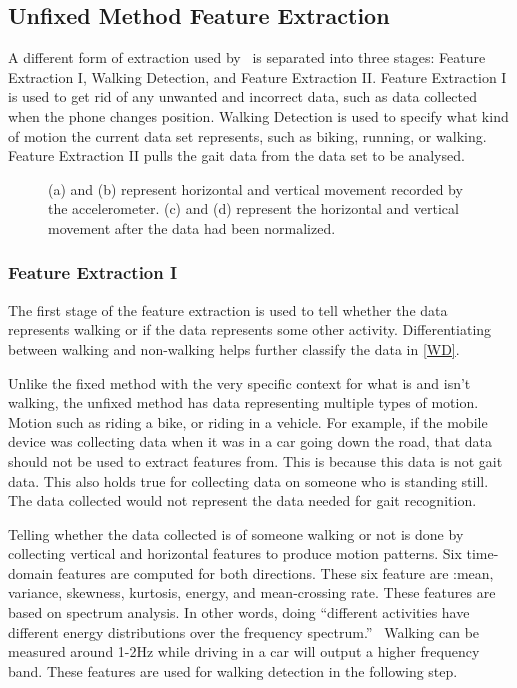 \documentclass{sig-alternate}
\begin{document}
\subsection{Unfixed Method Feature Extraction}
	A different form of extraction used by~\cite{Lu:2014} is separated into three stages: Feature Extraction I, Walking Detection, and Feature Extraction II. Feature Extraction I is used to get rid of any unwanted and incorrect data, such as data collected when the phone changes position. Walking Detection is used to specify what kind of motion the current data set represents, such as biking, running, or walking. Feature Extraction II pulls the gait data from the data set to be analysed. 
\begin{figure}
\centering
{}
\caption{(a) and (b) represent horizontal and vertical movement recorded by the accelerometer. (c) and (d) represent the horizontal and vertical movement after the data had been normalized.}
\label{fig:TD1}
\end{figure}


\subsubsection{Feature Extraction I}
	The first stage of the feature extraction is used to tell whether the data represents walking or if the data represents some other activity. Differentiating between walking and non-walking helps further classify the data in \ref{WD}.
	
	 Unlike the fixed method with the very specific context for what is and isn't walking, the unfixed method has data representing multiple types of motion. Motion such as riding a bike, or riding in a vehicle. For example, if the mobile device was collecting data when it was in a car going down the road, that data should not be used to extract features from. This is because this data is not gait data. This also holds true for collecting data on someone who is standing still. The data collected would not represent the data needed for gait recognition.
 	
	Telling whether the data collected is of someone walking or not is done by collecting vertical and horizontal features to produce motion patterns. Six time-domain features are computed for both directions. These six feature are :mean, variance, skewness, kurtosis, energy, and mean-crossing rate. These features are based on spectrum analysis. In other words, doing ``different activities have different energy distributions over the frequency spectrum.''~\cite{Lu:2014} Walking can be measured around 1-2Hz while driving in a car will output a higher frequency band. These features are used for walking detection in the following step.
			
\end{document}
